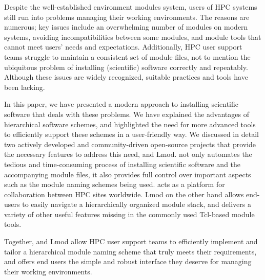 Despite the well-established environment modules system, users of HPC systems still
run into problems managing their working environments. The reasons are numerous; key
issues include an overwhelming number of modules on modern systems, avoiding
incompatibilities between some modules, and module tools that cannot meet users' needs 
and expectations. Additionally, HPC user support teams struggle to maintain a
consistent set of module files, not to mention the ubiquitous problem of
installing (scientific) software correctly and repeatably. Although these issues are
widely recognized, suitable practices and tools have been lacking.

In this paper, we have presented a modern approach to installing scientific software
that deals with these problems. We have explained the advantages of
hierarchical software schemes, and highlighted the need for more advanced tools to
efficiently support these schemes in a user-friendly way. We discussed in detail two
actively developed and community-driven open-source projects that provide the
necessary features to address this need, \easybuild{} and Lmod. \easybuild{} not only
automates the tedious and time-consuming process of installing scientific software
and the accompanying module files, it also provides full control over important
aspects such as the module naming schemes being used. \easybuild{} acts as a platform
for collaboration between HPC sites worldwide. Lmod on the other hand allows end-users
to easily navigate a hierarchically organized module stack, and delivers a variety of
other useful features missing in the commonly used Tcl-based module tools.

Together, \easybuild{} and Lmod allow HPC user support teams to efficiently implement
and tailor a hierarchical module naming scheme that truly meets their requirements,
and offers end users the simple and robust interface they deserve for managing their
working environments.
